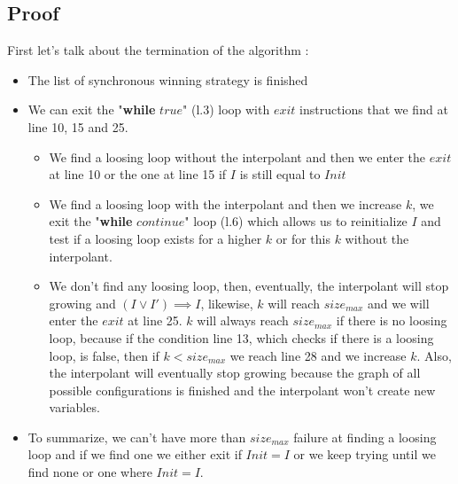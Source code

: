 \documentclass{article}
\begin{document}
\subsection{Proof}

\noindent First let's talk about the termination of the algorithm :
\begin{itemize}
    \item The list of synchronous winning strategy is finished
    \item We can exit the "\textbf{while} $true$" (l.3) loop with $exit$ instructions that we find at line 10, 15 and 25.
    \begin{itemize}
        \item We find a loosing loop without the interpolant and then we enter the $exit$ at line 10 or the one at line 15 if $I$ is still equal to $Init$
        \item We find a loosing loop with the interpolant and then we increase $k$, we exit the "\textbf{while} $continue$" loop (l.6) which allows us to reinitialize $I$ and test if a loosing loop exists for a higher $k$ or for this $k$ without the interpolant.
        \item We don't find any loosing loop, then, eventually, the interpolant will stop growing and $(I \lor I') \implies I$, likewise, $k$ will reach $size_{max}$ and we will enter the $exit$ at line 25. $k$ will always reach $size_{max}$ if there is no loosing loop, because if the condition line 13, which checks if there is a loosing loop, is false, then if $k < size_{max}$ we reach line 28 and we increase $k$. Also, the interpolant will eventually stop growing because the graph of all possible configurations is finished and the interpolant won't create new variables.
    \end{itemize}
    \item To summarize, we can't have more than $size_{max}$ failure at finding a loosing loop and if we find one we either exit if $Init = I$ or we keep trying until we find none or one where $Init = I$.
\end{itemize}
\end{document}
